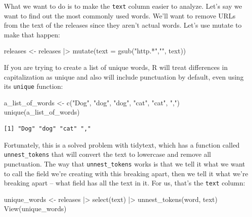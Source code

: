\documentclass[
  letterpaper,
  DIV=11,
  numbers=noendperiod]{scrreprt}
\newenvironment{Shaded}{\begin{snugshade}}{\end{snugshade}}
\newcommand{\AttributeTok}[1]{\textcolor[rgb]{0.40,0.45,0.13}{#1}}
\newcommand{\FunctionTok}[1]{\textcolor[rgb]{0.28,0.35,0.67}{#1}}
\newcommand{\NormalTok}[1]{\textcolor[rgb]{0.00,0.23,0.31}{#1}}
\newcommand{\OtherTok}[1]{\textcolor[rgb]{0.00,0.23,0.31}{#1}}
\newcommand{\SpecialCharTok}[1]{\textcolor[rgb]{0.37,0.37,0.37}{#1}}
\newcommand{\StringTok}[1]{\textcolor[rgb]{0.13,0.47,0.30}{#1}}
\begin{document}
What we want to do is to make the \texttt{text} column easier to
analyze. Let's say we want to find out the most commonly used words.
We'll want to remove URLs from the text of the releases since they
aren't actual words. Let's use mutate to make that happen:

\begin{Shaded}
\begin{Highlighting}[]
\NormalTok{releases }\OtherTok{\textless{}{-}}\NormalTok{ releases }\SpecialCharTok{|\textgreater{}}
  \FunctionTok{mutate}\NormalTok{(}\AttributeTok{text =} \FunctionTok{gsub}\NormalTok{(}\StringTok{"http.*"}\NormalTok{,}\StringTok{""}\NormalTok{, text))}
\end{Highlighting}
\end{Shaded}

If you are trying to create a list of unique words, R will treat
differences in capitalization as unique and also will include
punctuation by default, even using its \texttt{unique} function:

\begin{Shaded}
\begin{Highlighting}[]
\NormalTok{a\_list\_of\_words }\OtherTok{\textless{}{-}} \FunctionTok{c}\NormalTok{(}\StringTok{"Dog"}\NormalTok{, }\StringTok{"dog"}\NormalTok{, }\StringTok{"dog"}\NormalTok{, }\StringTok{"cat"}\NormalTok{, }\StringTok{"cat"}\NormalTok{, }\StringTok{","}\NormalTok{)}
\FunctionTok{unique}\NormalTok{(a\_list\_of\_words)}
\end{Highlighting}
\end{Shaded}

\begin{verbatim}
[1] "Dog" "dog" "cat" ","  
\end{verbatim}

Fortunately, this is a solved problem with tidytext, which has a
function called \texttt{unnest\_tokens} that will convert the text to
lowercase and remove all punctuation. The way that
\texttt{unnest\_tokens} works is that we tell it what we want to call
the field we're creating with this breaking apart, then we tell it what
we're breaking apart -- what field has all the text in it. For us,
that's the \texttt{text} column:

\begin{Shaded}
\begin{Highlighting}[]
\NormalTok{unique\_words }\OtherTok{\textless{}{-}}\NormalTok{ releases }\SpecialCharTok{|\textgreater{}} \FunctionTok{select}\NormalTok{(text) }\SpecialCharTok{|\textgreater{}}
  \FunctionTok{unnest\_tokens}\NormalTok{(word, text)}
\FunctionTok{View}\NormalTok{(unique\_words)}
\end{Highlighting}
\end{Shaded}
\end{document}
